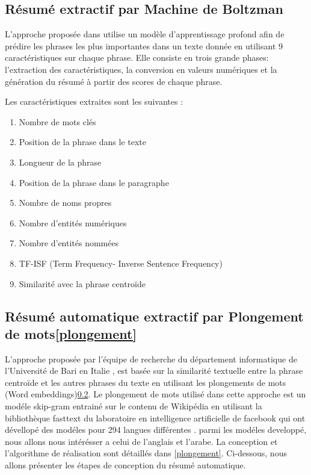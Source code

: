     \subsection{Résumé extractif par Machine de Boltzman}
    L'approche proposée dans \cite{boltzman} utilise un modèle d'apprentissage profond afin de prédire les phrases les plus importantes dans un texte donnée en utilisant 9 caractéristiques sur chaque phrase. Elle consiste en trois grande phases: l'extraction des caractéristiques, la conversion en valeurs numériques et la génération du résumé à partir des scores de chaque phrase. 

    Les caractéristiques extraites sont les suivantes :
    \begin{enumerate}
        \item{Nombre de mots clés}
        \item{Position de la phrase dans le texte}
        \item{Longueur de la phrase}
        \item{Position de la phrase dans le paragraphe}
        \item{Nombre de noms propres}
        \item{Nombre d'entités numériques}
        \item{Nombre d'entités nommées}
        \item{TF-ISF (Term Frequency- Inverse Sentence Frequency)}
        \item{Similarité avec la phrase centroïde}
    \end{enumerate} 

    \subsection{Résumé automatique extractif par Plongement de mots\ref{plongement}}
    L'approche proposée par l'équipe de recherche du département informatique de l'Université de Bari en Italie \cite{bari}, est basée sur la similarité textuelle entre la phrase centroïde et les autres phrases du texte en utilisant les plongements de mots (Word embeddings)\ref{}. Le plongement de mots utilisé dans cette approche est un modéle skip-gram entrainé sur le contenu de Wikipédia \cite{} en utilisant la bibliothèque fasttext du laboratoire en intelligence artificielle de facebook qui ont dévellopé des modéles pour 294 langues différentes \cite{fasttext}. parmi les modéles developpé, nous allons nous intérésser a celui de l'anglais et l'arabe. La conception et l'algorithme de réalisation sont détaillés dans \ref{plongement}. Ci-dessous, nous allons présenter les étapes de conception du résumé automatique.

